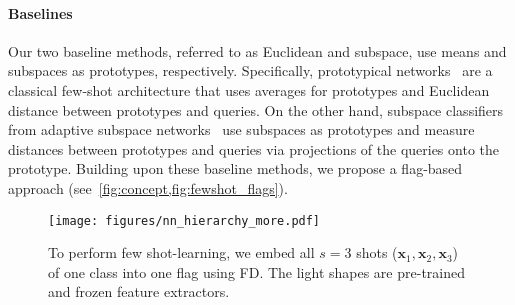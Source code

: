 \paragraph{Baselines}
Our two baseline methods, referred to as Euclidean and subspace, use means and subspaces as prototypes, respectively. Specifically, prototypical networks~\cite{snell2017prototypical} are a classical few-shot architecture that uses averages for prototypes and Euclidean distance between prototypes and queries. On the other hand, subspace classifiers from adaptive subspace networks~\cite{simon2020adaptive} use subspaces as prototypes and measure distances between prototypes and queries via projections of the queries onto the prototype. Building upon these baseline methods, we propose a flag-based approach (see~\cref{fig:concept,fig:fewshot_flags}).




\begin{figure}[t]
        \centering
        \texttt{[image: figures/nn\_hierarchy\_more.pdf]}
        \caption{To perform few shot-learning, we embed all $s=3$ shots ($\bm{x}_1, \bm{x}_2, \bm{x}_3$) of one class into one flag using FD. The light shapes are pre-trained and frozen feature extractors.}
        \label{fig:fewshot_flags}
    \end{figure}
